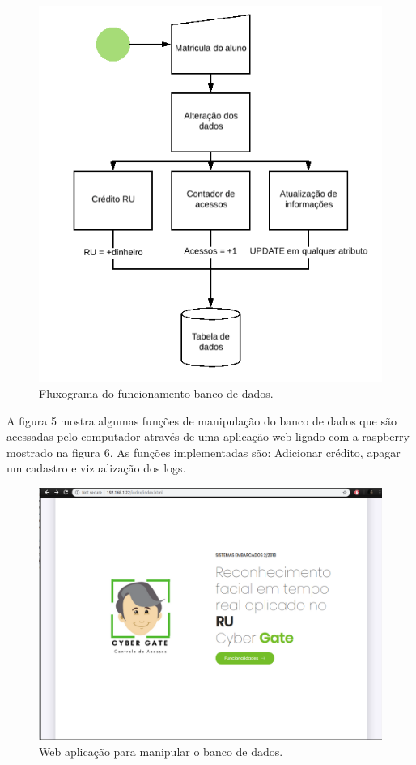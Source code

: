 \documentclass[conference,compsoc]{IEEEtran}
\begin{document}
\begin{figure}[!ht]
		\centering
		\includegraphics[scale=0.25]{Banco_de_dados.png}
		\caption{Fluxograma do funcionamento banco de dados.}
\end{figure}

A figura 5 mostra algumas funções de manipulação do banco de dados que são acessadas pelo computador através de uma aplicação web ligado com a raspberry mostrado na figura 6. As funções implementadas são: Adicionar crédito, apagar um cadastro e vizualização dos logs. 

\begin{figure}[!ht]
		\centering
		\includegraphics[scale=0.15]{web_app.png}
		\caption{Web aplicação para manipular o banco de dados.}
\end{figure}
\end{document}
